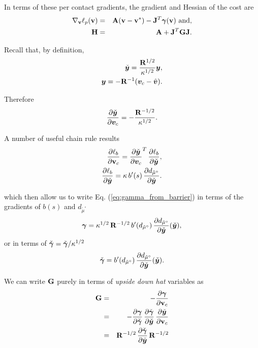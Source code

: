 In terms of these per contact gradients, the gradient and Hessian of the cost
are
\begin{eqnarray}
    \nabla_{\mathbf{v}}\ell_p({\mathbf{v}}) &=& {\mathbf{A}}({\mathbf{v}}-{\mathbf{v}}^*) -
    {\mathbf{J}}^T{\bm\gamma}({\mathbf{v}})\text{ and,}\\
    {\mathbf{H}}&=&{\mathbf{A}} + {\mathbf{J}}^T{\mathbf{G}}{\mathbf{J}}.
\end{eqnarray}

Recall that, by definition,
\begin{eqnarray}
    \check{{\bm{y}}} = \frac{{\mathbf{R}}^{1/2}}{\kappa^{1/2}}{\bm{y}},\\
    {\bm{y}} = -{\mathbf{R}}^{-1}({\bm{v}}_c-\hat{{\bm{v}}}).
\end{eqnarray}

Therefore
\begin{equation}
    \frac{\partial\check{{\bm{y}}}}{\partial{\bm{v}}_c} = -\frac{{\mathbf{R}}^{-1/2}}{\kappa^{1/2}}.
\end{equation}

A number of useful chain rule results
\begin{eqnarray}
    \frac{\partial\ell_b}{\partial{\mathbf{v}}_c} =
    \frac{\partial\check{{\bm{y}}}}{\partial{\bm{v}}_c}^T\,\frac{\partial\ell_b}{\partial\check{{\bm{y}}}},\\
    \frac{\partial\ell_b}{\partial\check{{\bm{y}}}} =
    \kappa\,b^\prime(s)\,\frac{\partial d_{\tilde{\mu}^\circ}}{\partial\check{{\bm{y}}}}.
\end{eqnarray}
    
which then allow us to write Eq. (\ref{eq:gamma_from_barrier}) in terms of the
gradients of $b(s)$ and $d_{\tilde{\mu}^\circ}$
\begin{eqnarray}
    {\bm\gamma} =
    \kappa^{1/2}\,{\mathbf{R}}^{-1/2}\,b^\prime(d_{\tilde{\mu}^\circ})\,\frac{\partial
    d_{\tilde{\mu}^\circ}}{\partial\check{{\bm{y}}}}(\check{{\bm{y}}}),
\end{eqnarray}
or in terms of $\check{{\bm\gamma}}=\tilde{{\bm\gamma}}/\kappa^{1/2}$
\begin{eqnarray}
    \check{{\bm\gamma}} = b^\prime(d_{\tilde{\mu}^\circ})\,\frac{\partial
    d_{\tilde{\mu}^\circ}}{\partial\check{{\bm{y}}}}(\check{{\bm{y}}}).
\end{eqnarray}

We can write ${\mathbf{G}}$ purely in terms of \textit{upside down hat} variables as
\begin{eqnarray}
    {\mathbf{G}} &=& -\frac{\partial{\bm\gamma}}{\partial{\mathbf{v}}_c} \nonumber\\
    &=&-\frac{\partial{\bm\gamma}}{\partial\check{{\bm\gamma}}}\,\frac{\partial\check{{\bm\gamma}}}{\partial\check{{\bm{y}}}}\,\frac{\partial\check{{\bm{y}}}}{\partial{\mathbf{v}}_c}\nonumber\\
    &=& {\mathbf{R}}^{-1/2}\,\frac{\partial\check{{\bm\gamma}}}{\partial\check{{\bm{y}}}}\,{\mathbf{R}}^{-1/2}
\end{eqnarray}

